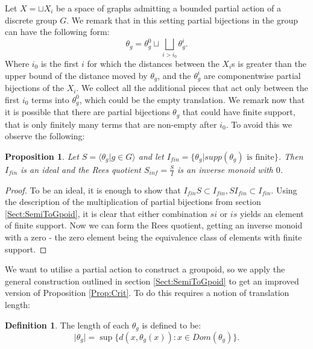 \documentclass[11pt]{amsart}
\theoremstyle{plain}
\newtheorem{proposition}[theorem]{Proposition}%
\theoremstyle{definition}%
\newtheorem{definition}[theorem]{Definition}%
\theoremstyle{remark}%
\begin{document}
Let $X= \sqcup X_{i}$ be a space of graphs admitting a bounded partial action of a discrete group $G$. We remark that in this setting partial bijections in the group can have the following form: 
\begin{equation*}
\theta_{g}=\theta_{g}^{0} \sqcup \bigsqcup_{i>i_{0}}\theta_{g}^{i}.
\end{equation*} 
Where $i_{0}$ is the first $i$ for which the distances between the $X_{i}$s is greater than the upper bound of the distance moved by $\theta_{g}$, and the $\theta_{g}^{i}$ are componentwise partial bijections of the $X_{i}$. We collect all the additional pieces that act only between the first $i_{0}$ terms into $\theta_{g}^{0}$, which could be the empty translation. We remark now that it is possible that there are partial bijections $\theta_{g}$ that could have finite support, that is only finitely many terms that are non-empty after $i_{0}$. To avoid this we observe the following:

\begin{proposition}
Let $S = \langle \theta_{g} | g \in G \rangle$ and let $I_{fin}= \lbrace \theta_{g} | supp(\theta_{g}) \mbox{ is finite} \rbrace$. Then $I_{fin}$ is an ideal and the Rees quotient $S_{inf}=\frac{S}{I}$ is an inverse monoid with $0$.
\end{proposition}
\begin{proof}
To be an ideal, it is enough to show that $I_{fin}S \subset I_{fin}, SI_{fin}\subset I_{fin}$. Using the description of the multiplication of partial bijections from section \ref{Sect:SemiToGpoid}, it is clear that either combination $si$ or $is$ yields an element of finite support. Now we can form the Rees quotient, getting an inverse monoid with a zero - the zero element being the equivalence class of elements with finite support.
\end{proof}

We want to utilise a partial action to construct a groupoid, so we apply the general construction outlined in section \ref{Sect:SemiToGpoid} to get an improved version of Proposition \ref{Prop:Crit}. To do this requires a notion of translation length:
\begin{definition}
The length of each $\theta_{g}$ is defined to be:
\begin{equation*}
\vert \theta_{g} \vert = \sup \lbrace d(x,\theta_{g}(x)) : x \in Dom(\theta_{g})\rbrace.
\end{equation*} 
\end{definition}
\end{document}
